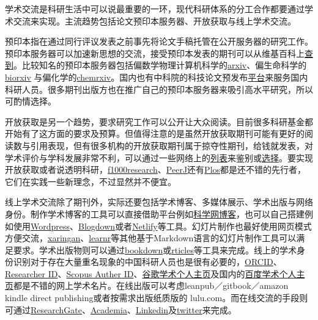 \documentclass[]{tufte-book}
\begin{document}
学术交流是科研生活中可以说最重要的一环，现代科研体系的分工合作都要通过学术交流来实现。主流趋势包括论文预印本服务器、开放获取与线上学术交流。

预印本指在通过同行评议发表之前事先将论文手稿托管在公开服务器的研究工作。预印本服务器可以加速新思想的交流，接受预印本发表的期刊可以从维基百科上\href{https://en.wikipedia.org/wiki/List_of_academic_journals_by_preprint_policy}{查到}。比较知名的预印本服务器包括偏数学物理计算机科学的\href{https://arxiv.org/}{arxiv}、偏生命科学的\href{https://www.biorxiv.org/}{biorxiv} 与偏化学的\href{https://chemrxiv.org/}{chemrxiv}。国内也有中科院的科技论文预发布\href{http://chinaxiv.org/home.htm}{平台}来服务国内科研人员。很多期刊出版方也在推广自己的预印本服务器来吸引高水平研究，所以可酌情选择。

开放获取是另一个趋势，要求研究工作可以公开让大众阅读。目前很多科研基金都开始有了这方面的要求及预算。但值得注意的是虽然开放获取期刊可能有更好的阅读数与引用表现，但有很多机构的开放获取期刊属于掠夺性期刊，给钱就发表，对学术评价与学科发展非常不利，可以通过一些网络上的\href{https://beallslist.net/}{列表}来鉴别或\href{https://doaj.org}{选择}。要实现开放获取或者说透明科研，\href{https://f1000research.com/}{f1000research}、\href{https://peerj.org/}{PeerJ}还有\href{https://www.plos.org/}{Plos}都是还不错的先行者，它们在实践一些新理念，不过显然并不便宜。

线上学术交流除了期刊外，实际还要包括学术博客、多媒体展示、学术出版与网络身份。制作学术博客的工具可以直接借助平台例如\href{http://blog.sciencenet.cn/}{科学网博客}，也可以自己搭建例如使用\href{https://zh-cn.wordpress.com/}{Wordpress}、\href{https://bookdown.org/yihui/blogdown/}{Blogdown}或者\href{https://www.netlify.com/}{Netlify}等工具。幻灯片制作也最好使用网页模式方便交流，\href{https://github.com/yihui/xaringan}{xaringan}、\href{https://rstudio.github.io/learnr/}{learnr}等其他基于Markdown语言的幻灯片制作工具可以满足要求。学术出版物则可以通过\href{https://bookdown.org/}{bookdown}或\href{https://github.com/rstudio/rticles}{rticles}等工具来完成。线上的学术身份识别对于存在大量重名现象的中国科研人员也是很有必要的，\href{https://orcid.org/}{ORCID}、\href{http://www.researcherid.com/}{Researcher ID}、\href{https://www.scopus.com/}{Scopus Auther ID}、\href{https://scholar.google.com}{谷歌学术个人主页}及国内的\href{https://xueshu.baidu.com/}{百度学术个人主页}都是不错的网上学术名片。在线出版可以考虑leanpub／gitbook／amazon kindle direct publishing或者按需求出版纸质版的 lulu.com。而在线交流的手段则可通过\href{https://www.researchgate.net/}{ResearchGate}、\href{https://www.academia.edu/}{Academia}、\href{https://www.linkedin.com/}{Linkedin}及\href{https://twitter.com/}{twitter}来完成。
\end{document}
